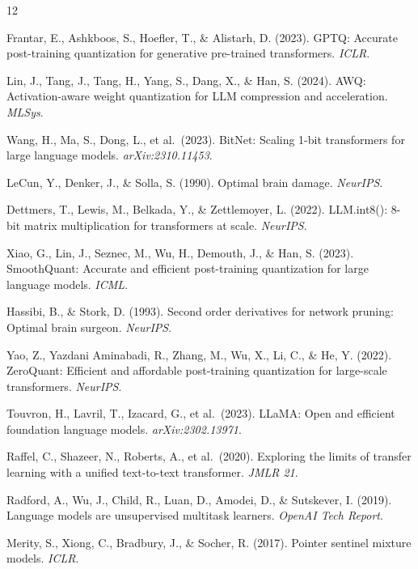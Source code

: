\documentclass[11pt]{article}
\begin{document}

\begin{thebibliography}{12}\small

Frantar, E., Ashkboos, S., Hoefler, T., \& Alistarh, D. (2023).
GPTQ: Accurate post-training quantization for generative pre-trained transformers.
\textit{ICLR}.

Lin, J., Tang, J., Tang, H., Yang, S., Dang, X., \& Han, S. (2024).
AWQ: Activation-aware weight quantization for LLM compression and acceleration.
\textit{MLSys}.

Wang, H., Ma, S., Dong, L., et al.\ (2023).
BitNet: Scaling 1-bit transformers for large language models.
\textit{arXiv:2310.11453}.

LeCun, Y., Denker, J., \& Solla, S. (1990).
Optimal brain damage. \textit{NeurIPS}.

Dettmers, T., Lewis, M., Belkada, Y., \& Zettlemoyer, L. (2022).
LLM.int8(): 8-bit matrix multiplication for transformers at scale. \textit{NeurIPS}.

Xiao, G., Lin, J., Seznec, M., Wu, H., Demouth, J., \& Han, S. (2023).
SmoothQuant: Accurate and efficient post-training quantization for large language models.
\textit{ICML}.

Hassibi, B., \& Stork, D. (1993).
Second order derivatives for network pruning: Optimal brain surgeon. \textit{NeurIPS}.

Yao, Z., Yazdani Aminabadi, R., Zhang, M., Wu, X., Li, C., \& He, Y. (2022).
ZeroQuant: Efficient and affordable post-training quantization for large-scale transformers.
\textit{NeurIPS}.

Touvron, H., Lavril, T., Izacard, G., et al.\ (2023).
LLaMA: Open and efficient foundation language models. \textit{arXiv:2302.13971}.

Raffel, C., Shazeer, N., Roberts, A., et al.\ (2020).
Exploring the limits of transfer learning with a unified text-to-text transformer.
\textit{JMLR 21}.

Radford, A., Wu, J., Child, R., Luan, D., Amodei, D., \& Sutskever, I. (2019).
Language models are unsupervised multitask learners. \textit{OpenAI Tech Report}.

Merity, S., Xiong, C., Bradbury, J., \& Socher, R. (2017).
Pointer sentinel mixture models. \textit{ICLR}.

\end{thebibliography}
\end{document}
